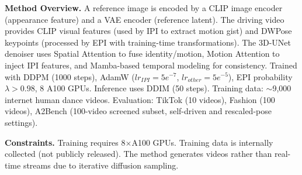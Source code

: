 \begin{tcolorbox}
\smallskip
\textbf{Method Overview.} A reference image is encoded by a CLIP image encoder (appearance feature) and a VAE encoder (reference latent). The driving video provides CLIP visual features (used by IPI to extract motion gist) and DWPose keypoints (processed by EPI with training-time transformations). The 3D-UNet denoiser uses Spatial Attention to fuse identity/motion, Motion Attention to inject IPI features, and Mamba-based temporal modeling for consistency. Trained with DDPM (1000 steps), AdamW ($lr_{IPI}=5e^{-7}$, $lr_{other}=5e^{-5}$), EPI probability $\lambda>0.98$, 8 A100 GPUs. Inference uses DDIM (50 steps). Training data: $\sim$9,000 internet human dance videos. Evaluation: TikTok (10 videos), Fashion (100 videos), A2Bench (100-video screened subset, self-driven and rescaled-pose settings).

\smallskip
\textbf{Constraints.} Training requires 8$\times$A100 GPUs. Training data is internally collected (not publicly released). The method generates videos rather than real-time streams due to iterative diffusion sampling.
\end{tcolorbox}

